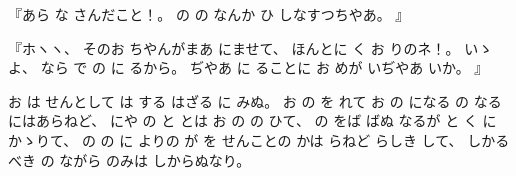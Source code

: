 %
『あら
な
さんだこと！。
%
の
の
なんか
ひ
しなすつちやあ。
』

%
『ホヽヽ、
%
そのお
ちやんがまあ
にませて、
%
ほんとに
く
お
りのネ！。
%
いゝよ、
%
なら
で
の
に
るから。
%
ぢやあ
に
ることに
お
めが
いぢやあ
いか。
』

%
お
は
せんとして
は
する
はざる
に
みぬ。
%
お
の
を
れて
お
の
になる
の
なるにはあらねど、
%
にや
の
と
とは
お
の
の
ひて、
%
の
をば
ばぬ
なるが
と
く
にかゝりて、
%
の
の
に
よりの
が
を
せんことの
かは
らねど
らしき
して、
%
しかるべき
の
ながら
のみは
しからぬなり。
